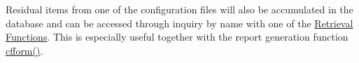 Residual items from one of the configuration files will also be accumulated in the database and can be accessed through inquiry by name with one of the \hyperlink{index_retrieval_functions}{Retrieval Functions}. This is especially useful together with the report generation function \hyperlink{group__report__generation_g2f8350e7d032c87b2a0e1cb6149a85ec}{cfform()}. 